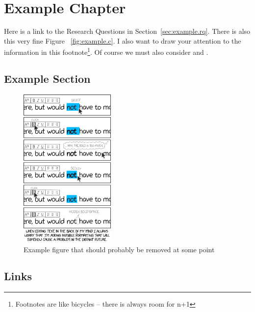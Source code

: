 \cleardoublepageforprint	%

\chapter{Example Chapter}
\label{chap:example}

Here is a link to the Research Questions in Section~\ref{sec:example.rq}. There is also this very fine Figure ~\ref{fig:example.c}. I also want to draw your attention to the information in this footnote\footnote{Footnotes are like bicycles -- there is always room for n+1}. Of course we must also consider \citet{leach2018iain} and \citet{martin2021shadow}.

\lipsum[2]

\section{Example Section}
\label{sec:example.examplesec}

\lipsum[2]

\begin{figure}[h!]
	\centering
	\captionsetup{justification=centering}
	\includegraphics[height=8cm]{images/examples/xkcd_2109_invisible_formatting_2x.png}
	\caption[Example figure A]{Example figure that should probably be removed at some point\protect\footnotemark}
	\label{fig:example.a}
\end{figure}

\section{Links}
\label{sec:example.links}

